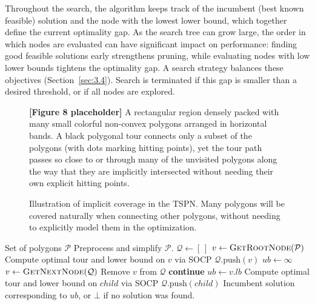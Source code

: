 \documentclass[11pt,a4paper]{article}
\theoremstyle{plain}
\begin{document}
Throughout the search, the algorithm keeps track of the incumbent (best known feasible) solution and the node with the lowest lower bound, which together define the current optimality gap. As the search tree can grow large, the order in which nodes are evaluated can have significant impact on performance: finding good feasible solutions early strengthens pruning, while evaluating nodes with low lower bounds tightens the optimality gap. A search strategy balances these objectives (Section~\ref{sec:3.4}). Search is terminated if this gap is smaller than a desired threshold, or if all nodes are explored.

\begin{figure}[h]
\centering
\begin{figplaceholder}
\textbf{[Figure 8 placeholder]} A rectangular region densely packed with many small colorful non-convex polygons arranged in horizontal bands. A black polygonal tour connects only a subset of the polygons (with dots marking hitting points), yet the tour path passes so close to or through many of the unvisited polygons along the way that they are implicitly intersected without needing their own explicit hitting points.
\end{figplaceholder}
\caption{Illustration of implicit coverage in the TSPN. Many polygons will be covered naturally when connecting other polygons, without needing to explicitly model them in the optimization.}
\label{fig:8}
\end{figure}

\begin{algorithm}[h]
\caption{Branch-and-Bound Algorithm}
\label{alg:1}
\begin{algorithmic}[1]
\Require Set of polygons $\mathcal{P}$
\State Preprocess and simplify $\mathcal{P}$.
\State $\mathcal{Q} \leftarrow [\,]$ 
\State $v \leftarrow \textsc{GetRootNode}(\mathcal{P})$ 
\State Compute optimal tour and lower bound on $v$ via SOCP 
\State $\mathcal{Q}.\text{push}(v)$
\State $ub \leftarrow \infty$
	\State $v \leftarrow \textsc{GetNextNode}(\mathcal{Q})$ 
	\State Remove $v$ from $\mathcal{Q}$
		\State \textbf{continue}
	\EndIf
		\State $ub \leftarrow v.lb$
	\Else
		 
			\State Compute optimal tour and lower bound on $child$ via SOCP
			\State $\mathcal{Q}.\text{push}(child)$
		\EndFor
	\EndIf
\EndWhile
\State \Return Incumbent solution corresponding to $ub$, or $\bot$ if no solution was found.
\end{algorithmic}
\end{algorithm}
\end{document}
